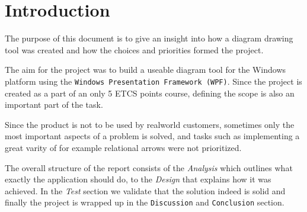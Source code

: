 \section{Introduction}
The purpose of this document is to give an insight into how a diagram drawing
tool was created and how the choices and priorities formed the project. 

The aim for the project was to build a useable diagram tool for the Windows
platform using the \texttt{Windows Presentation Framework (WPF)}. Since the project is
created as a part of an only 5 ETCS points course, defining the scope is also an
important part of the task.

Since the product is not to be used by realworld customers, sometimes only the
most important aspects of a problem is solved, and tasks such as implementing a great varity of for
example relational arrows were not prioritized.

The overall structure of the report consists of the
\textit{Analysis} which outlines what exactly the application should do, to the
\textit{Design} that explains how it was achieved. In the \textit{Test} section
we validate that the solution indeed is solid and finally the project is wrapped
up in the \texttt{Discussion} and \texttt{Conclusion} section.
